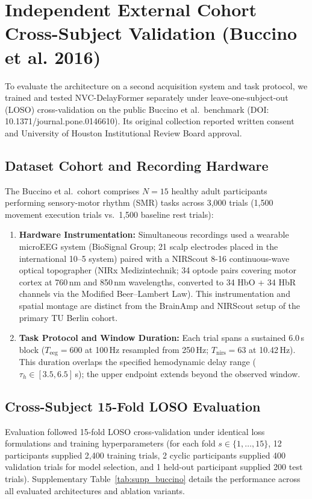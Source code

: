 \documentclass[journal]{IEEEtran}
\begin{document}
\section{Independent External Cohort Cross-Subject Validation (Buccino et al. 2016)}
\label{sec:supp_buccino}

To evaluate the architecture on a second acquisition system and task protocol, we trained and tested NVC-DelayFormer separately under leave-one-subject-out (LOSO) cross-validation on the public Buccino et al.\ benchmark \cite{buccino2016hybrid} (DOI: 10.1371/journal.pone.0146610). Its original collection reported written consent and University of Houston Institutional Review Board approval.

\subsection{Dataset Cohort and Recording Hardware}
The Buccino et al.\ cohort comprises $N=15$ healthy adult participants performing sensory-motor rhythm (SMR) tasks across 3,000 trials (1,500 movement execution trials vs.\ 1,500 baseline rest trials):
\begin{enumerate}
    \item \textbf{Hardware Instrumentation:} Simultaneous recordings used a wearable microEEG system (BioSignal Group; 21 scalp electrodes placed in the international 10--5 system) paired with a NIRScout 8-16 continuous-wave optical topographer (NIRx Medizintechnik; 34 optode pairs covering motor cortex at 760\,nm and 850\,nm wavelengths, converted to 34 HbO + 34 HbR channels via the Modified Beer--Lambert Law). This instrumentation and spatial montage are distinct from the BrainAmp and NIRScout setup of the primary TU Berlin cohort.
    \item \textbf{Task Protocol and Window Duration:} Each trial spans a sustained $6.0$\,s block ($T_{\mathrm{eeg}} = 600$ at 100\,Hz resampled from 250\,Hz; $T_{\mathrm{nirs}} = 63$ at 10.42\,Hz). This duration overlaps the specified hemodynamic delay range ($\tau_h \in [3.5, 6.5]$\,s); the upper endpoint extends beyond the observed window.
\end{enumerate}

\subsection{Cross-Subject 15-Fold LOSO Evaluation}
Evaluation followed 15-fold LOSO cross-validation under identical loss formulations and training hyperparameters (for each fold $s \in \{1,\dots,15\}$, 12 participants supplied 2,400 training trials, 2 cyclic participants supplied 400 validation trials for model selection, and 1 held-out participant supplied 200 test trials). Supplementary Table~\ref{tab:supp_buccino} details the performance across all evaluated architectures and ablation variants.
\end{document}
